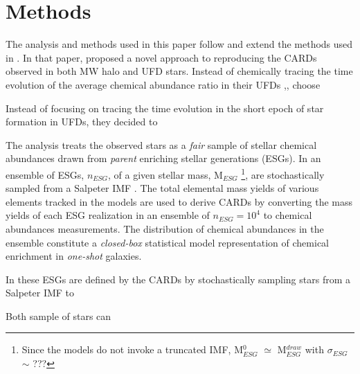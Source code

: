 \section{Methods}
\label{methods}

The analysis and methods used in this paper follow and extend the methods used in \citet{Lee_2013}. In that paper, \citet{Lee_2013} proposed a novel approach to reproducing the CARDs observed in both MW halo and UFD stars. Instead of chemically tracing the time evolution of the average chemical abundance ratio in their UFDs \citep[see, e.g.,][]{Cohen_2010},, \citet{Lee_2013} choose 


Instead of focusing on tracing the time evolution in the short epoch of star formation in UFDs, they decided to 



The analysis treats the observed stars as a {\it fair} sample of stellar chemical abundances drawn from {\it parent} enriching stellar generations (ESGs). In \citet{Lee_2013} an ensemble of ESGs, $n_{ESG}$, of a given stellar mass, M$_{ESG}$
\footnote{Since the models do not invoke a truncated IMF, M$_{ESG}^0$ $\simeq$ M$_{ESG}^{draw}$ with $\sigma_{ESG}$ $\sim$ ???}, 
are stochastically sampled from a Salpeter IMF \citep{Salpeter_1955}. The total elemental mass yields of various elements tracked in the models are used to derive CARDs by converting the mass yields of each ESG realization in an ensemble of $n_{ESG} = 10^4$ to chemical abundances measurements. The distribution of chemical abundances in the ensemble constitute a {\it closed-box} statistical model representation of chemical enrichment in {\it one-shot} galaxies. 


In \citet{Lee_2013} these ESGs are defined by the CARDs by stochastically sampling stars from a Salpeter IMF \citep{Salpeter_1955} to    

Both sample of stars can 